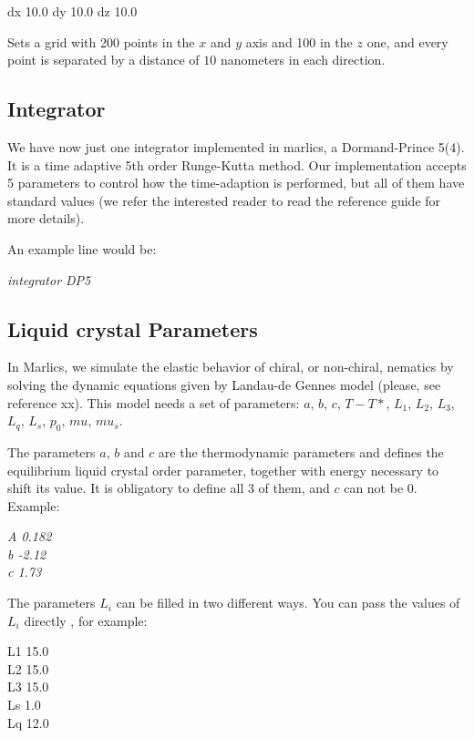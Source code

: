 \documentclass{article}
\newcommand{\consoleline}[2][0.5cm]
{\vspace{#1}
\textit{{#2}}
\vspace{#1}
}
\begin{document}
dx        10.0    %
dy        10.0    %
dz        10.0    %

Sets a grid with 200 points in the $x$ and $y$ axis and 100 in the $z$ one, and every point is separated by a distance of $10$ nanometers in each direction.

\subsection{Integrator}

 We have now just one integrator implemented in marlics, a Dormand-Prince 5(4). It is a time adaptive 5th order Runge-Kutta method. Our implementation accepts 5 parameters to control how the time-adaption is performed, but all of them have standard values (we refer the interested reader to read the reference guide for more details).

 An example line would be:

 \consoleline{integrator DP5}

\subsection{Liquid crystal Parameters}

In Marlics, we simulate the elastic behavior of chiral, or non-chiral, nematics by solving the dynamic equations given by Landau-de Gennes 
model (please, see reference xx). This model needs a set of parameters: $a$, $b$, $c$, $T-T*$, $L_1$, $L_2$, $L_3$, $L_q$, $L_s$, $p_0$, $mu$, $mu_s$.

The parameters $a$, $b$ and $c$ are the thermodynamic parameters and defines the equilibrium liquid crystal order parameter, together with energy necessary to shift its value. It is obligatory to define all 3 of them, and $c$ can not be 0.
Example:

\consoleline{
A  0.182\\
b -2.12\\
c 1.73}


The parameters $L_i$ can be filled in two different ways. You can pass the values of $L_i$ directly , for example:

L1  15.0\\
L2  15.0\\
L3  15.0\\
Ls  1.0 \\
Lq  12.0\\
\end{document}
